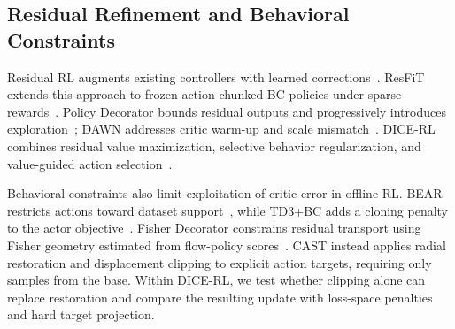 \subsection{Residual Refinement and Behavioral Constraints}

Residual RL augments existing controllers with learned
corrections~\cite{johannink2019residual}. ResFiT extends this approach to
frozen action-chunked BC policies under sparse rewards~\cite{ankile2025resfit}.
Policy Decorator bounds residual outputs and progressively introduces
exploration~\cite{yuan2025policydecorator}; DAWN addresses critic warm-up
and scale mismatch~\cite{dawn2026}. DICE-RL combines residual value
maximization, selective behavior regularization, and value-guided action
selection~\cite{dicerl2026}.

Behavioral constraints also limit exploitation of critic error in offline
RL. BEAR restricts actions toward dataset support~\cite{kumar2019bear},
while TD3+BC adds a cloning penalty to the actor
objective~\cite{fujimoto2021td3bc}. Fisher Decorator constrains residual
transport using Fisher geometry estimated from flow-policy
scores~\cite{cheng2026fisherdecorator}. CAST instead applies radial
restoration and displacement clipping to explicit action targets, requiring
only samples from the base. Within DICE-RL, we test whether clipping alone
can replace restoration and compare the resulting update with loss-space
penalties and hard target projection.
